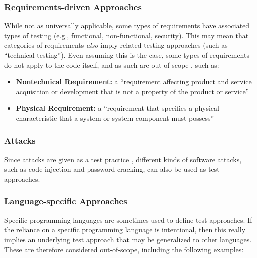     \subsubsection{Requirements-driven Approaches}
    \label{req-test}
    While not as universally applicable, some types of requirements have associated
    types of testing (e.g., functional, non-functional, security). This may mean
    that categories of requirements \emph{also} imply related testing approaches
    (such as ``technical testing''). \ifnotpaper Even assuming this is the case, some types of
        requirements do not apply to the code itself, and as such are out of scope%
        , such as:
        \begin{itemize}
            \item \textbf{Nontechnical Requirement:} a ``requirement affecting product
                  and service acquisition or development that is not a property of
                  the product or service'' \citep[p.~293]{IEEE2017}
            \item \textbf{Physical Requirement:} a ``requirement that specifies a
                  physical characteristic that a system or system component must
                  possess'' \citep[p.~322]{IEEE2017}
        \end{itemize}
    \fi

    \subsubsection{Attacks}
    \label{attacks}
    Since attacks are given as a test practice \citep[p.~34]{IEEE2022}, different
    kinds of software attacks, such as code injection and password cracking, can
    also be used as test approaches.

    \subsubsection{Language-specific Approaches}
    \label{lang-test}
    Specific programming languages are sometimes used to define test approaches.
    If the reliance on a specific programming language is intentional, then
    this really implies an underlying test approach that may be generalized to
    other languages. These are therefore considered out-of-scope,
    including the following examples:

